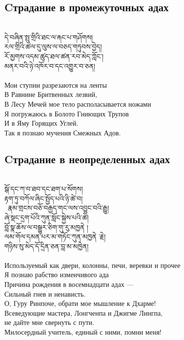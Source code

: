 \newpage
\subsection*{Cтрадание в промежуточных адах}
\\
\ti
དེ་བཞིན་སྤུ་གྲིའི་ཐང་ལ་རྐང་པ་གཤོགས།\\
རལ་གྲིའི་ཚལ་དུ་ལུས་ལ་བཅད་གཏུབས་བྱེད།\\
རོ་མྱགས་འདམ་ཚུད་ཐལ་ཚན་རབ་མེད་ཀློང་། \\
མནར་བའི་ཉེ་འཁོར་བ་དང་འགྱུར་བ་ཅན།\\
\\
\ru
Мои ступни разрезаются на ленты\\
В Равнине Бритвенных лезвий,\\
В Лесу Мечей мое тело располасывается ножами\\
Я погружаюсь в Болото Гниющих Трупов\\
И в Яму Горящих Углей.\\
Так я познаю мучения Смежных Адов.

\subsection*{Cтрадание в неопределенных адах}
\\
\ti
སྒོ་དང་ཀ་བ་ཐབ་དང་ཐག་པ་སོགས།\\
རྟག་ཏུ་བཀོལ་ཞིང་སྤྱོད་པའི་ཉི་ཚེ་བ། \\\
རྣམ་གྲངས་བཅོ་བརྒྱད་གང་ལས་འབྱུང་བའི་རྒྱུ། \\
ཞེ་སྡང་དྲག་པོའི་ཀུན་སློང་སྐྱེས་པའི་ཚེ། \\
བློ་སྣ་ཆོས་ལ་བསྒྱུར་ཅིག་གུ་རུ་མཁྱནེ ། \\
ལམ་གོལ་དམན་པར་མ་གཏོང་ཀུན་མཁྱནེ ་རྗེ། \\
གཉིས་སུ་མེད་དོ་དྲིན་ཅན་བླ་མ་མཁྱེན།\\
\\
\ru
Используемый как двери, колонны, печи, веревки и прочее\\
Я познаю рабство изменчивого ада\\
Причина рождения в восем\-надцати адах —\\
Сильный гнев и ненависть.\\
О, Гуру Ринпоче, обрати мое мышление к Дхарме!\\
Всеведующие мастера, Лонг\-ченпа и Джигме Лингпа,\\
не дайте мне свернуть с пути.\\
Милосердный учитель, единый с ними, помни меня!
\\

